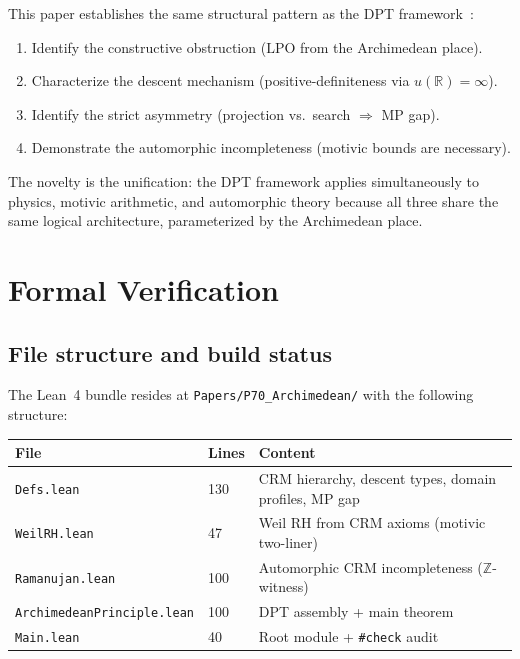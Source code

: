 \documentclass[11pt]{article}
\theoremstyle{definition}
\theoremstyle{remark}
\newcommand{\Z}{\mathbb{Z}}
\newcommand{\R}{\mathbb{R}}
\newcommand{\LPO}{\mathrm{LPO}}
\newcommand{\MP}{\mathrm{MP}}
\begin{document}
This paper establishes the same structural pattern as the DPT framework~\cite{Paper50}:
\begin{enumerate}
\item Identify the constructive obstruction ($\LPO$ from the Archimedean place).
\item Characterize the descent mechanism (positive-definiteness via $u(\R) = \infty$).
\item Identify the strict asymmetry (projection vs.\ search $\Rightarrow$ $\MP$ gap).
\item Demonstrate the automorphic incompleteness (motivic bounds are necessary).
\end{enumerate}
The novelty is the unification: the DPT framework applies simultaneously to physics, motivic arithmetic, and automorphic theory because all three share the same logical architecture, parameterized by the Archimedean place.

\section{Formal Verification}
\label{sec:formal}

\subsection{File structure and build status}

The Lean~4 bundle resides at \texttt{Papers/P70\_Archimedean/} with the following structure:

\begin{center}
\begin{tabular}{lll}
\toprule
\textbf{File} & \textbf{Lines} & \textbf{Content} \\
\midrule
\texttt{Defs.lean} & 130 & CRM hierarchy, descent types, domain profiles, MP gap \\
\texttt{WeilRH.lean} & 47 & Weil RH from CRM axioms (motivic two-liner) \\
\texttt{Ramanujan.lean} & 100 & Automorphic CRM incompleteness ($\Z$-witness) \\
\texttt{ArchimedeanPrinciple.lean} & 100 & DPT assembly + main theorem \\
\texttt{Main.lean} & 40 & Root module + \texttt{\#check} audit \\
\bottomrule
\end{tabular}
\end{center}
\end{document}
